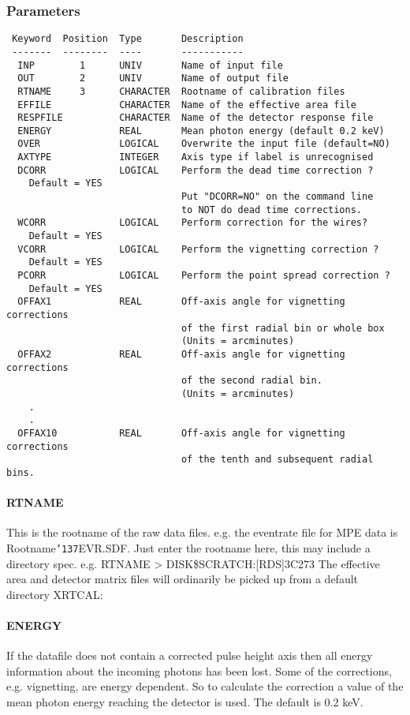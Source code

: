 \documentclass{book}
\renewcommand{\_}{{\tt\char'137}}     %
\begin{document}
\subsubsection{Parameters}
\begin{verbatim}
 Keyword  Position  Type       Description
 -------  --------  ----       -----------
  INP        1      UNIV       Name of input file
  OUT        2      UNIV       Name of output file
  RTNAME     3      CHARACTER  Rootname of calibration files
  EFFILE            CHARACTER  Name of the effective area file
  RESPFILE          CHARACTER  Name of the detector response file
  ENERGY            REAL       Mean photon energy (default 0.2 keV)
  OVER              LOGICAL    Overwrite the input file (default=NO)
  AXTYPE            INTEGER    Axis type if label is unrecognised
  DCORR             LOGICAL    Perform the dead time correction ?
    Default = YES
                               Put "DCORR=NO" on the command line
                               to NOT do dead time corrections.
  WCORR             LOGICAL    Perform correction for the wires?
    Default = YES
  VCORR             LOGICAL    Perform the vignetting correction ?
    Default = YES
  PCORR             LOGICAL    Perform the point spread correction ?
    Default = YES
  OFFAX1            REAL       Off-axis angle for vignetting corrections
                               of the first radial bin or whole box
                               (Units = arcminutes)
  OFFAX2            REAL       Off-axis angle for vignetting corrections
                               of the second radial bin.
                               (Units = arcminutes)
    .
    .
  OFFAX10           REAL       Off-axis angle for vignetting corrections
                               of the tenth and subsequent radial bins.

\end{verbatim}\paragraph{RTNAME}
This is the rootname of the raw data files. e.g. the eventrate file
for MPE data is Rootname\_EVR.SDF. Just enter the rootname here, this may
include a directory spec. e.g. RTNAME > DISK\$SCRATCH:[RDS]3C273
The effective area and detector matrix files will ordinarily be
picked up from a default directory XRTCAL:

\paragraph{ENERGY}
If the datafile does not contain a corrected pulse height axis then
all energy information about the incoming photons has been lost.
Some of the corrections, e.g. vignetting, are energy dependent. So
to calculate the correction a value of the mean photon energy
reaching the detector is used. The default is 0.2 keV.
\end{document}
